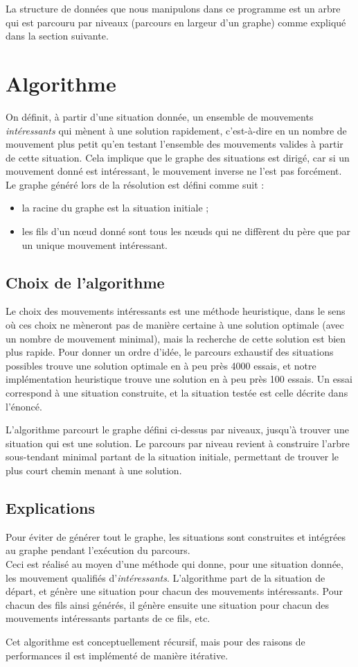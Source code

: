 \documentclass{article}
\begin{document}
		La structure de données que nous manipulons dans ce programme est un arbre qui est parcouru par niveaux (parcours en largeur d'un graphe)
		comme expliqué dans la section suivante.

\section{Algorithme}
		On définit, à partir d'une situation donnée, un ensemble de mouvements \textit{intéressants} qui mènent
		à une solution rapidement, c'est-à-dire en un nombre de mouvement plus petit qu'en testant l'ensemble des mouvements valides à
		partir de cette situation. Cela implique que le graphe des situations est dirigé, car si un mouvement donné est intéressant,
		le mouvement inverse ne l'est pas forcément. \\
		Le graphe généré lors de la résolution est défini comme suit :

		\begin{itemize}
			\item la racine du graphe est la situation initiale ;
			\item les fils d'un nœud donné sont tous les nœuds qui ne diffèrent du père que par un unique mouvement intéressant.
		\end{itemize}

	\subsection{Choix de l'algorithme}
		Le choix des mouvements intéressants est une méthode heuristique, dans le sens où ces choix ne mèneront pas de manière certaine
		à une solution optimale (avec un nombre de mouvement minimal), mais la recherche de cette solution est bien plus rapide.
		Pour donner un ordre d'idée, le parcours exhaustif des situations possibles trouve une solution optimale en à peu près 4000 essais,
		et notre implémentation heuristique trouve une solution en à peu près 100 essais. Un essai correspond à une situation construite,
		et la situation testée est celle décrite dans l'énoncé.

		L'algorithme parcourt le graphe défini ci-dessus par niveaux, jusqu'à trouver une situation qui est une solution.
		Le parcours par niveau revient à construire l'arbre sous-tendant minimal partant de la situation initiale,
		permettant de trouver le plus court chemin menant à une solution.

	\subsection{Explications}
		Pour éviter de générer tout le graphe, les situations sont construites et intégrées au graphe pendant l'exécution du parcours. \\
		Ceci est réalisé au moyen d'une méthode qui donne, pour une situation donnée, les mouvement qualifiés d'\textit{intéressants}.
		L'algorithme part de la situation de départ, et génère une situation pour chacun des mouvements intéressants.
		Pour chacun des fils ainsi générés, il génère ensuite une situation pour chacun des mouvements intéressants partants de ce fils, etc.

		Cet algorithme est conceptuellement récursif, mais pour des raisons de performances il est implémenté de manière itérative.
\end{document}
